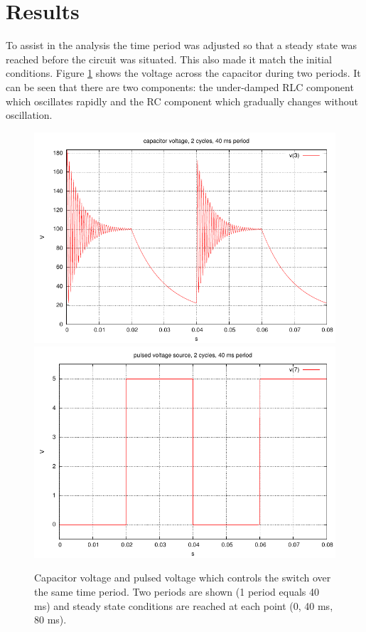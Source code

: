 \documentclass{article}
\begin{document}
\section{Results}

To assist in the analysis the time period was adjusted so
that a steady state was reached before the circuit was situated.
This also made it match the initial conditions.
Figure \ref{fig:capv} shows the voltage across the capacitor
during two periods.
It can be seen that there are two components: the under-damped RLC component
which oscillates rapidly and the RC component which gradually changes
without oscillation.

\begin{figure}
\center
\includegraphics[scale=1.0]{spice/p_v3-80ms} \\
\includegraphics[scale=1.0]{spice/p_v7-80ms}
\caption{Capacitor voltage and pulsed voltage which controls the switch
over the same time period.
Two periods are shown (1 period equals 40 ms) and steady state conditions
are reached at each point (0, 40 ms, 80 ms).
}
\label{fig:capv}
\end{figure}
\end{document}
